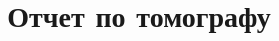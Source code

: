 \def\usetitle{}
\def\usegraphics{}



\title{Отчет по томографу}


	
	\ifdefined\usetitle
	    
	\fi
	
	

